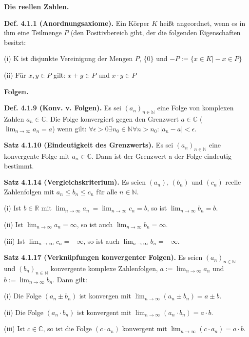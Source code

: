 \textbf{Die reellen Zahlen.}

\textbf{Def. 4.1.1 (Anordnungsaxiome).} Ein Körper $K$ heißt angeordnet, wenn es in ihm eine Teilmenge $P$ (den Positivbereich gibt, der die folgenden Eigenschaften besitzt:

(i) K ist disjunkte Vereinigung der Mengen $P$, $\{ 0 \}$ und $-P := \{ x \in K \vert -x \in P \}$

(ii) Für $x,y \in P$ gilt: $x + y \in P$ und $x \cdot y \in P$

\textbf{Folgen.}

\textbf{Def. 4.1.9 (Konv. v. Folgen).} Es sei $(a_n)_{n \in \mathbb N}$ eine Folge von komplexen Zahlen $a_n \in \mathbb C$. Die Folge konvergiert gegen den Grenzwert $a \in \mathbb C$ ($\lim_{n \rightarrow \infty} a_n = a$) wenn gilt: $\forall \epsilon > 0 \exists n_0 \in \mathbb N \forall n > n_0 : \vert a_n - a \vert < \epsilon$. 

\textbf{Satz 4.1.10 (Eindeutigkeit des Grenzwerts).} Es sei $(a_n)_{n \in \mathbb N}$ eine konvergente Folge mit $a_n \in \mathbb{C}$. Dann ist der Grenzwert a der Folge eindeutig bestimmt.

\textbf{Satz 4.1.14 (Vergleichskriterium).} Es seien $(a_n)$, $(b_n)$ und $(c_n)$ reelle Zahlenfolgen mit $a_n \leq b_n \leq c_n$ für alle $n \in \mathbb N$.

(i) Ist $b \in \mathbb R$ mit $\lim_{n \rightarrow \infty} a_n\ = \lim_{n \rightarrow \infty} c_n = b$, so ist $\lim_{n \rightarrow \infty} b_n = b$.

(ii) Ist $\lim_{n \rightarrow \infty} a_n = \infty$, so ist auch $\lim_{n \rightarrow \infty} b_n = \infty$.

(iii) Ist $\lim_{n \rightarrow \infty} c_n = -\infty$, so ist auch $\lim_{n \rightarrow \infty} b_n = -\infty$.

\textbf{Satz 4.1.17 (Verknüpfungen konvergenter Folgen).} Es seien $(a_n)_{n\in \mathbb N}$ und $(b_n)_{n \in \mathbb N}$ konvergente komplexe Zahlenfolgen, $a := \lim_{n \rightarrow \infty} a_n$ und $b := \lim_{n \rightarrow \infty} b_n$. Dann gilt:

(i) Die Folge $(a_n \pm b_n)$ ist konvergen mit $\lim_{n \rightarrow \infty} (a_n \pm b_n) = a \pm b$.

(ii) Die Folge $(a_n \cdot b_n)$ ist konvergent mit $\lim_{n \rightarrow \infty} (a_n \cdot b_n) = a \cdot b$.

(iii) Ist $c \in \mathbb C$, so ist die Folge $(c \cdot a_n)$ konvergent mit $\lim_{n \rightarrow \infty} (c \cdot a_n ) = a \cdot b$.

